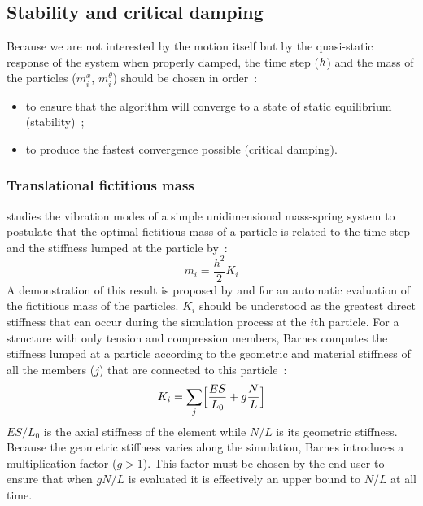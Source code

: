 
\subsection{Stability and critical damping}\label{sec=stab_crit}
Because we are not interested by the motion itself but by the quasi-static response of the system when properly damped, the time step ($h{}$) and the mass of the particles ($m_i^x$, $m_i^{\theta}$) should be chosen in order~:
\begin{itemize}
\item to ensure that the algorithm will converge to a state of static equilibrium (stability)~;
\item to produce the fastest convergence possible (critical damping).
\end{itemize}

\subsubsection{Translational fictitious mass}

 studies the vibration modes of a simple unidimensional mass-spring system to postulate that the optimal fictitious mass of a particle is related to the time step and the stiffness lumped at the particle by~:
\begin{equation}
	m_i = \frac{h^2}{2} K_i
\end{equation}
A demonstration of this result is proposed by  and  for an automatic evaluation of the fictitious mass of the particles. $K_i$ should be understood as the greatest direct stiffness that can occur during the simulation process at the $i$th particle. For a structure with only tension and compression members, Barnes computes the stiffness lumped at a particle according to the geometric and material stiffness of all the members ($j$) that are connected to this particle~:
\begin{equation}
	K_i = \sum_j \Bigl[\frac{ES}{L_0} + g \frac{N}{L} \Bigr]
\end{equation}
$ES/L_0$ is the axial stiffness of the element while $N/L$ is its geometric stiffness. Because the geometric stiffness varies along the simulation, Barnes introduces a multiplication factor ($g > 1$). This factor must be chosen by the end user to ensure that when $gN/L$ is evaluated it is effectively an upper bound to $N/L$ at all time.

